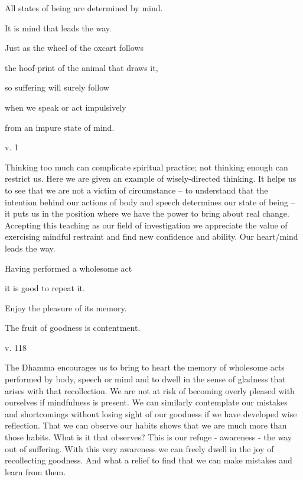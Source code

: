 \documentclass[a4paper,portrait,12pt]{article}
\begin{document}
All states of being are determined by mind.


It is mind that leads the way.


Just as the wheel of the oxcart follows 


the hoof-print of the animal that draws it, 


so suffering will surely follow 


when we speak or act impulsively


from an impure state of mind.





v. 1





Thinking too much can complicate spiritual practice; not thinking enough can restrict us. Here we are given an example of wisely-directed thinking. It helps us to see that we are not a victim of circumstance -- to understand that the intention behind our actions of body and speech determines our state of being -- it puts us in the position where we have the power to bring about real change. Accepting this teaching as our field of investigation we appreciate the value of exercising mindful restraint and find new confidence and ability. Our heart/mind leads the way.














Having performed a wholesome act


it is good to repeat it.


Enjoy the pleasure of its memory. 


The fruit of goodness is contentment.





v. 118





The Dhamma encourages us to bring to heart the memory of wholesome acts performed by body, speech or mind and to dwell in the sense of gladness that arises with that recollection. We are not at risk of becoming overly pleased with ourselves if mindfulness is present. We can similarly contemplate our mistakes and shortcomings without losing sight of our goodness if we have developed wise reflection. That we can observe our habits shows that we are much more than those habits. What is it that observes? This is our refuge - awareness - the way out of suffering. With this very awareness we can freely dwell in the joy of recollecting goodness. And what a relief to find that we can make mistakes and learn from them.
\end{document}
